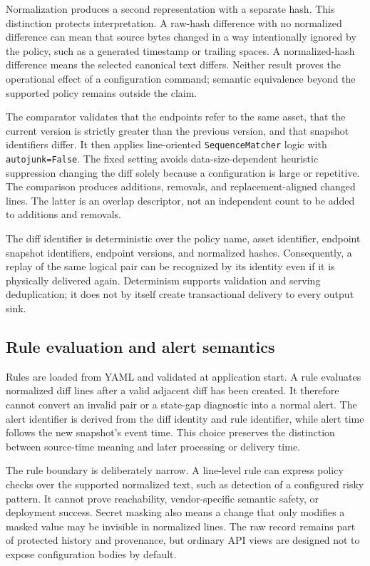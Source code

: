 Normalization produces a second representation with a separate hash. This distinction protects interpretation. A raw-hash difference with no normalized difference can mean that source bytes changed in a way intentionally ignored by the policy, such as a generated timestamp or trailing spaces. A normalized-hash difference means the selected canonical text differs. Neither result proves the operational effect of a configuration command; semantic equivalence beyond the supported policy remains outside the claim.

The comparator validates that the endpoints refer to the same asset, that the current version is strictly greater than the previous version, and that snapshot identifiers differ. It then applies line-oriented \texttt{SequenceMatcher} logic with \texttt{autojunk=False}. The fixed setting avoids data-size-dependent heuristic suppression changing the diff solely because a configuration is large or repetitive. The comparison produces additions, removals, and replacement-aligned changed lines. The latter is an overlap descriptor, not an independent count to be added to additions and removals.

The diff identifier is deterministic over the policy name, asset identifier, endpoint snapshot identifiers, endpoint versions, and normalized hashes. Consequently, a replay of the same logical pair can be recognized by its identity even if it is physically delivered again. Determinism supports validation and serving deduplication; it does not by itself create transactional delivery to every output sink.

\subsection{Rule evaluation and alert semantics}

Rules are loaded from YAML and validated at application start. A rule evaluates normalized diff lines after a valid adjacent diff has been created. It therefore cannot convert an invalid pair or a state-gap diagnostic into a normal alert. The alert identifier is derived from the diff identity and rule identifier, while alert time follows the new snapshot's event time. This choice preserves the distinction between source-time meaning and later processing or delivery time.

The rule boundary is deliberately narrow. A line-level rule can express policy checks over the supported normalized text, such as detection of a configured risky pattern. It cannot prove reachability, vendor-specific semantic safety, or deployment success. Secret masking also means a change that only modifies a masked value may be invisible in normalized lines. The raw record remains part of protected history and provenance, but ordinary API views are designed not to expose configuration bodies by default.

